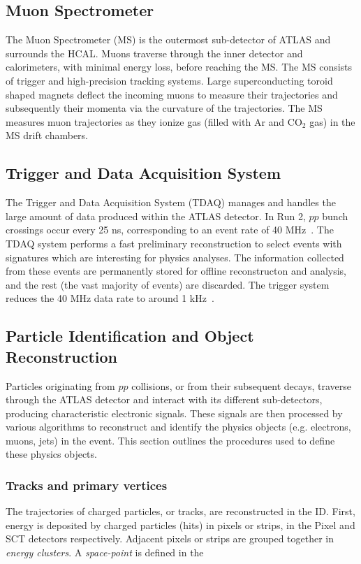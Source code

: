 \subsection{Muon Spectrometer}
The Muon Spectrometer (MS) is the outermost sub-detector of ATLAS and surrounds the HCAL. Muons traverse through the inner detector and calorimeters, with minimal energy loss, before reaching the MS. The MS consists of trigger and high-precision tracking systems. Large superconducting toroid shaped magnets deflect the incoming muons to measure their trajectories and subsequently their momenta via the curvature of the trajectories. The MS measures muon trajectories as they ionize gas (filled with Ar and CO$_{2}$ gas) in the MS drift chambers.

\subsection{Trigger and Data Acquisition System}
The Trigger and Data Acquisition System (TDAQ) manages and handles the large amount of data produced within the ATLAS detector. In Run 2, $pp$ bunch crossings occur every 25 ns, corresponding to an event rate of 40 MHz~\cite{Collaboration_2008}. The TDAQ system performs a fast preliminary reconstruction to select events with signatures which are interesting for physics analyses. The information collected from these events are permanently stored for offline reconstructon and analysis, and the rest (the vast majority of events) are discarded. The trigger system reduces the 40 MHz data rate to around 1 kHz~\cite{Collaboration_2008}.


\subsection{Particle Identification and Object Reconstruction}


Particles originating from $pp$ collisions, or from their subsequent decays, traverse through the ATLAS detector and interact with its different sub-detectors, producing characteristic electronic signals. These signals are then processed by various algorithms to reconstruct and identify the physics objects (e.g. electrons, muons, jets) in the event. This section outlines the procedures used to define these physics objects.

\subsubsection{Tracks and primary vertices}

The trajectories of charged particles, or tracks, are reconstructed in the ID. First, energy is deposited by charged particles (hits) in pixels or strips, in the Pixel and SCT detectors respectively. Adjacent pixels or strips are grouped together in \textit{energy clusters}. A \textit{space-point} is defined in the 
